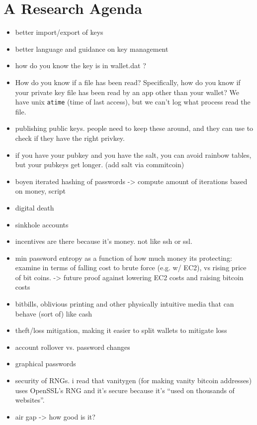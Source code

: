 


\section{A Research Agenda}



\begin{itemize}
  \item better import/export of keys
  \item better language and guidance on key management 
  \item how do you know the key is in wallet.dat ?  
  \item How do you know if a file has been read? Specifically, how do you know if your private key file has been read by an app other than your wallet? We have unix \texttt{atime} (time of last access), but we can't log what process read the file. 
  \item publishing public keys. people need to keep these around, and they can use to check if they have the right privkey. 
  \item if you have your pubkey and you have the salt, you can avoid rainbow tables, but your pubkeys get longer. (add salt via commitcoin) 
  \item boyen iterated hashing of passwords -> compute amount of iterations based on money, script
  \item digital death
  \item sinkhole accounts
  \item incentives are there because it's money. not like ssh or ssl. 
  \item min password entropy as a function of how much money its protecting: examine in terms of falling cost to brute force (e.g. w/ EC2), vs rising price of bit coins. -> future proof against lowering EC2 costs and raising bitcoin costs
  \item bitbills, oblivious printing and other physically intuitive media that can behave (sort of) like cash
  \item theft/loss mitigation, making it easier to split wallets to mitigate loss
  \item account rollover vs. password changes
  \item graphical passwords
  \item security of RNGs. i read that vanitygen (for making vanity bitcoin addresses) uses OpenSSL's RNG and it's secure because it's ``used on thousands of websites''. 
  \item air gap -> how good is it?
\end{itemize}

